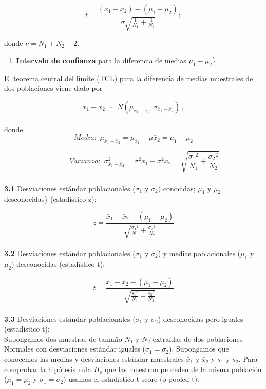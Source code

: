 \documentclass[
]{agujournal2019}
\providecommand{\tightlist}{%
  \setlength{\itemsep}{0pt}\setlength{\parskip}{0pt}}\usepackage{longtable,booktabs,array}
\begin{document}
\[t=\frac{(\bar{x_1}-\bar{x_2})-(\mu_1-\mu_2)}{\sigma\sqrt{\frac{1}{N_1} + \frac{1}{N_2}}};\]

donde \(\nu=N_1+N_2-2\).\\

\begin{enumerate}
\def\labelenumi{(\arabic{enumi})}
\setcounter{enumi}{2}
\tightlist
\item
  \textbf{Intervalo de confianza} para la diferencia de medias
  \(\mu_1 - \mu_2\)\}\\
\end{enumerate}

El teorema central del límite (TCL) para la diferencia de medias
muestrales de dos poblaciones viene dado por

\[\bar{x}_1-\bar{x}_2\,\sim\,{ N}(\mu_{\bar{x}_1-\bar{x}_2},\sigma_{\bar{x}_1-\bar{x}_2})\,,\]\\

donde
\[{ Media:}\,\,\mu_{\bar{x}_1-\bar{x}_2}=\mu_{\bar{x}_1}-\mu{\bar{x}_2}=\mu_1-\mu_2\]

\[\,\,\,\,\,\,\,\,\,\,\,\,\,\,\,\,\,\,{ Varianza:}\,\,\sigma^2_{\bar{x}_1-\bar{x}_2}=
   \sigma^2{\bar{x}_1}+\sigma^2{\bar{x}_2}=
   \sqrt{  \frac{{\sigma_1}^2}{N_1} + \frac{{\sigma_2}^2}{N_2} }\]\\

\textbf {3.1} Desviaciones estándar poblacionales (\(\sigma_1\) y
\(\sigma_2\)) conocidas; \(\mu_1\) y \(\mu_2\) desconocidas\}
(estadístico z):

\[z=\frac{\bar{x}_1-\bar{x}_2-(\mu_1-\mu_2)}
         {\sqrt{\frac{{\sigma_1}^2}{N_1}+\frac{{\sigma_2}^2}{N_2}}}\]\\

\textbf{3.2} Desviaciones estándar poblacionales (\(\sigma_1\) y
\(\sigma_2\)) y medias poblacionales (\(\mu_1\) y \(\mu_2\))
desconocidas (estadístico t):

\[t=\frac{\bar{x}_1-\bar{x}_2-(\mu_1-\mu_2)}
              {\sqrt{\frac{{s_1}^2}{N_1}+\frac{{s_2}^2}{N_2}}}\]\\

\textbf{3.3} Desviaciones estándar poblacionales (\(\sigma_1\) y
\(\sigma_2\)) desconocidas pero iguales (estadístico t):\\

Supongamos dos muestras de tamaño \(N_1\) y \(N_2\) extraídas de dos
poblaciones Normales con desviaciones estándar iguales
(\(\sigma_1=\sigma_2\)). Supongamos que conocemos las medias y
desviaciones estándar muestrales \(\bar{x}_1\) y \(\bar{x}_2\) y \(s_1\)
y \(s_2\). Para comprobar la hipótesis nula \(H_o\) que las muestran
proceden de la misma población (\(\mu_1=\mu_2\) y \(\sigma_1=\sigma_2\))
usamos el estadístico t-score (o pooled t):
\end{document}
